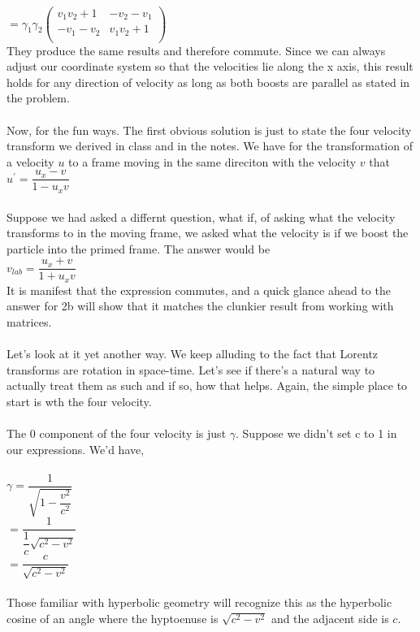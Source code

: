 \documentclass[prb,preprint]
{revtex4-1}
\newcommand{\PRLsep}{\noindent\makebox[\linewidth]{\resizebox{0.8888\linewidth}{2pt}{$\bullet$}}\bigskip}
\begin{document}
\\
$  = \gamma_1 \gamma_2 
\begin{pmatrix}
v_1 v_2 + 1 & -v_2 - v_1\\
-v_1 - v_2 & v_1 v_2 + 1\\
\end{pmatrix} $
\\
They produce the same results and therefore commute.  Since we can always adjust our coordinate system so that the velocities lie along the x axis, this result holds for any direction of velocity as long as both boosts are parallel as stated in the problem.
\\
\PRLsep
\\
Now, for the fun ways.  The first obvious solution is just to state the four velocity transform we derived in class and in the notes.  We have for the transformation of a velocity $u$ to a frame moving in the same direciton with the velocity $v$ that
\\
$u^\prime = \dfrac{u_x - v}{1-u_x v}$
\\
\\
Suppose we had asked a differnt question, what if, of asking what the velocity transforms to in the moving frame, we asked what the velocity is if we boost the particle into the primed frame.  The answer would be
\\
$v_{lab} = \dfrac{u_x + v}{1+u_x v}$
\\
It is manifest that the expression commutes, and a quick glance ahead to the answer for 2b will show that it matches the clunkier result from working with matrices.
\\
\\
Let's look at it yet another way.  We keep alluding to the fact that Lorentz transforms are rotation in space-time.  Let's see if there's a natural way to actually treat them as such and if so, how that helps.  Again, the  simple place to start is wth the four velocity.
\\
\\
The 0 component of the four velocity is just $\gamma$.  Suppose we didn't set c to 1 in our expressions.  We'd have,
\\
\\
$\gamma = \dfrac{1}{\sqrt{1 - \dfrac{v^2}{c^2}}}$
\\
$= \dfrac{1}{\dfrac{1}{c}\sqrt{c^2 - v^2}}$
\\
$= \dfrac{c}{\sqrt{c^2 - v^2}}$
\\
\\
Those familiar with hyperbolic geometry will recognize this as the hyperbolic cosine of an angle where the hyptoenuse is $\sqrt{c^2 - v^2}$ and the adjacent side is $c$.
\end{document}
